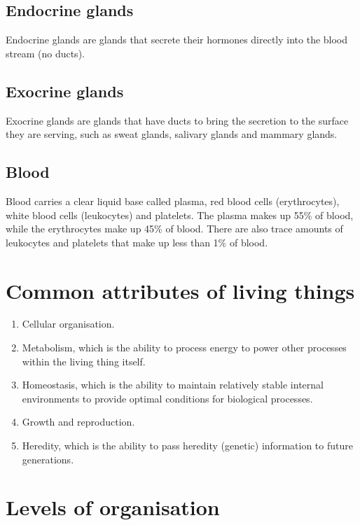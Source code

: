 \documentclass[11pt]{article}
\begin{document}
\subsection{Endocrine glands}
\label{sec:org6351985}
Endocrine glands are glands that secrete their hormones directly into the blood stream (no ducts).

\subsection{Exocrine glands}
\label{sec:org064169f}
Exocrine glands are glands that have ducts to bring the secretion to the surface they are serving, such as sweat glands, salivary glands and mammary glands.

\subsection{Blood}
\label{sec:orgf97dd8f}
Blood carries a clear liquid base called plasma, red blood cells (erythrocytes), white blood cells (leukocytes) and platelets. The plasma makes up 55\% of blood, while the erythrocytes make up 45\% of blood. There are also trace amounts of leukocytes and platelets that make up less than 1\% of blood.

\newpage

\section{Common attributes of living things}
\label{sec:orge4e43fb}
\begin{enumerate}
\item Cellular organisation.
\item Metabolism, which is the ability to process energy to power other processes within the living thing itself.
\item Homeostasis, which is the ability to maintain relatively stable internal environments to provide optimal conditions for biological processes.
\item Growth and reproduction.
\item Heredity, which is the ability to pass heredity (genetic) information to future generations.
\end{enumerate}

\newpage

\section{Levels of organisation}
\label{sec:org705a222}
\end{document}
